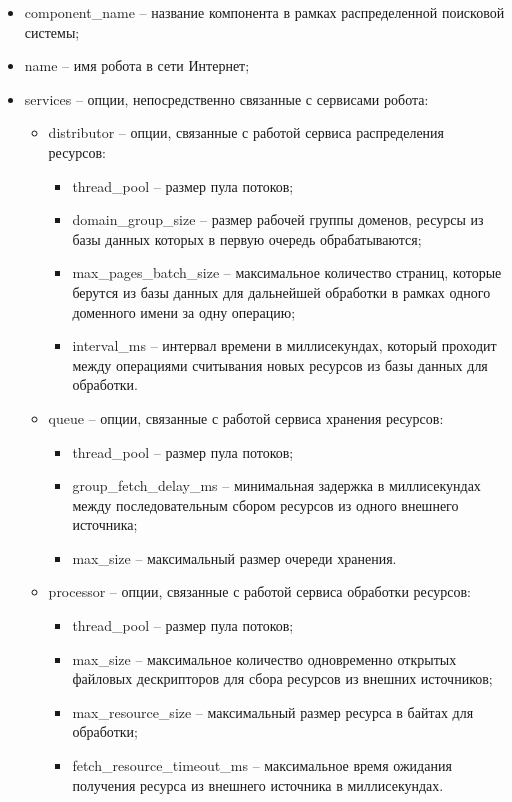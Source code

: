 \begin{itemize}
\item component\_name -- название компонента в рамках распределенной поисковой системы;
\item name -- имя робота в сети Интернет;
\item services -- опции, непосредственно связанные с сервисами робота:
\begin{itemize}
\item distributor -- опции, связанные с работой сервиса распределения ресурсов:
\begin{itemize}
\item thread\_pool -- размер пула потоков;
\item domain\_group\_size -- размер рабочей группы доменов, ресурсы из базы данных которых в первую очередь обрабатываются;
\item max\_pages\_batch\_size -- максимальное количество страниц, которые берутся из базы данных для дальнейшей обработки в рамках одного доменного имени за одну операцию;
\item interval\_ms -- интервал времени в миллисекундах, который проходит между операциями считывания новых ресурсов из базы данных для обработки.
\end{itemize}
\item queue -- опции, связанные с работой сервиса хранения ресурсов:
\begin{itemize}
\item thread\_pool -- размер пула потоков;
\item group\_fetch\_delay\_ms -- минимальная задержка в миллисекундах между последовательным сбором ресурсов из одного внешнего источника;
\item max\_size -- максимальный размер очереди хранения.
\end{itemize}
\item processor -- опции, связанные с работой сервиса обработки ресурсов:
\begin{itemize}
\item thread\_pool -- размер пула потоков;
\item max\_size -- максимальное количество одновременно открытых файловых дескрипторов для сбора ресурсов из внешних источников;
\item max\_resource\_size -- максимальный размер ресурса в байтах для обработки;
\item fetch\_resource\_timeout\_ms -- максимальное время ожидания получения ресурса из внешнего источника в миллисекундах.
\end{itemize}

\end{itemize}
\end{itemize}
